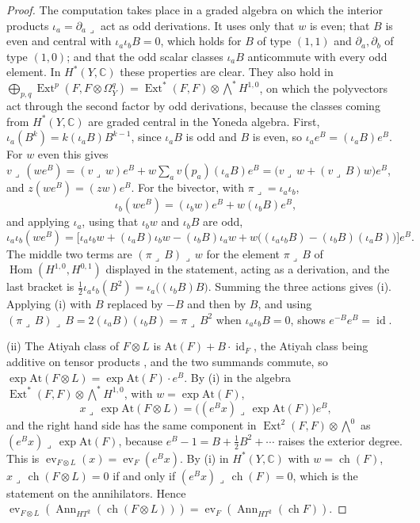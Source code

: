 \documentclass[11pt,reqno]{amsart}
\theoremstyle{plain}
\theoremstyle{definition}
\theoremstyle{remark}
\newcommand{\CC}{\mathbb{C}}
\DeclareMathOperator{\ch}{ch}
\DeclareMathOperator{\Hom}{Hom}
\DeclareMathOperator{\Ext}{Ext}
\DeclareMathOperator{\id}{id}
\DeclareMathOperator{\Ann}{Ann}
\begin{document}
\begin{proof}
The computation takes place in a graded algebra on which the interior
products $\iota_{a}=\partial_{a}\lrcorner$ act as odd derivations. It uses
only that $w$ is even; that $B$ is even and central with
$\iota_{a}\iota_{b}B=0$, which holds for $B$ of type $(1,1)$ and
$\partial_{a},\partial_{b}$ of type $(1,0)$; and that the odd scalar classes
$\iota_{a}B$ anticommute with every odd element. In $H^{*}(Y,\CC)$ these
properties are clear. They also hold in
$\bigoplus_{p,q}\Ext^{p}(F,F\otimes\Omega^{q}_{Y})=\Ext^{*}(F,F)\otimes
\bigwedge^{*}H^{1,0}$, on which the polyvectors act through the second factor
by odd derivations, because the classes coming from $H^{*}(Y,\CC)$ are graded
central in the Yoneda algebra. First, $\iota_{a}(B^{k})=k(\iota_{a}B)B^{k-1}$,
since $\iota_{a}B$ is odd and $B$ is even, so
$\iota_{a}e^{B}=(\iota_{a}B)e^{B}$. For $w$ even this gives
$v\lrcorner\,(we^{B})=(v\lrcorner\,w)e^{B}+w\sum_{a}v(p_{a})(\iota_{a}B)e^{B}
=\bigl(v\lrcorner\,w+(v\lrcorner\,B)w\bigr)e^{B}$, and
$z(we^{B})=(zw)e^{B}$. For the bivector, with $\pi\lrcorner=\iota_{a}\iota_{b}$,
\[
  \iota_{b}(we^{B})=(\iota_{b}w)e^{B}+w(\iota_{b}B)e^{B},
\]
and applying $\iota_{a}$, using that $\iota_{b}w$ and $\iota_{b}B$ are odd,
\[
  \iota_{a}\iota_{b}(we^{B})
  =\bigl[\iota_{a}\iota_{b}w
   +(\iota_{a}B)\iota_{b}w-(\iota_{b}B)\iota_{a}w
   +w\bigl((\iota_{a}\iota_{b}B)-(\iota_{b}B)(\iota_{a}B)\bigr)\bigr]e^{B}.
\]
The middle two terms are $(\pi\lrcorner\,B)\lrcorner\,w$ for the element
$\pi\lrcorner\,B$ of $\Hom(H^{1,0},H^{0,1})$ displayed in the statement, acting
as a derivation, and the last bracket is
$\tfrac12\iota_{a}\iota_{b}(B^{2})=\iota_{a}\bigl((\iota_{b}B)B\bigr)$.
Summing the three actions gives (i). Applying (i) with $B$ replaced by $-B$
and then by $B$, and using
$(\pi\lrcorner\,B)\lrcorner\,B=2(\iota_{a}B)(\iota_{b}B)=\pi\lrcorner\,B^{2}$
when $\iota_{a}\iota_{b}B=0$, shows $e^{-B}e^{B}=\id$.

(ii) The Atiyah class of $F\otimes L$ is $\mathrm{At}(F)+B\cdot\id_{F}$,
the Atiyah class being additive on tensor products \cite[Section 3]{BF03},
and the two summands commute, so
$\exp\mathrm{At}(F\otimes L)=\exp\mathrm{At}(F)\cdot e^{B}$. By (i) in the
algebra $\Ext^{*}(F,F)\otimes\bigwedge^{*}H^{1,0}$, with $w=\exp\mathrm{At}(F)$,
\[
  x\lrcorner\,\exp\mathrm{At}(F\otimes L)
  =\bigl((e^{B}x)\lrcorner\,\exp\mathrm{At}(F)\bigr)e^{B},
\]
and the right hand side has the same component in
$\Ext^{2}(F,F)\otimes\bigwedge^{0}$ as $(e^{B}x)\lrcorner\,\exp\mathrm{At}(F)$,
because $e^{B}-1=B+\tfrac12B^{2}+\cdots$ raises the exterior degree. This is
$\operatorname{ev}_{F\otimes L}(x)=\operatorname{ev}_{F}(e^{B}x)$. By (i) in
$H^{*}(Y,\CC)$ with $w=\ch(F)$, $x\lrcorner\,\ch(F\otimes L)=0$ if and only
if $(e^{B}x)\lrcorner\,\ch(F)=0$, which is the statement on the annihilators.
Hence $\operatorname{ev}_{F\otimes L}(\Ann_{HT^{2}}(\ch(F\otimes L)))
=\operatorname{ev}_{F}(\Ann_{HT^{2}}(\ch F))$.
\end{proof}
\end{document}
